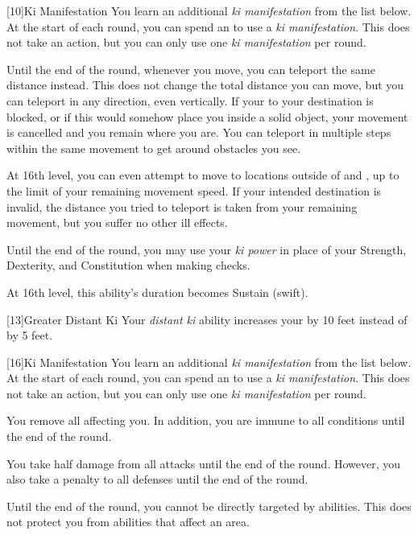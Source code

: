             [10]{Ki Manifestation}
            You learn an additional \textit{ki manifestation} from the list below.
            At the start of each round, you can spend an  to use a \textit{ki manifestation}.
            This does not take an action, but you can only use one \textit{ki manifestation} per round.
            {

                Until the end of the round, whenever you move, you can teleport the same distance instead.
                This does not change the total distance you can move, but you can teleport in any direction, even vertically.
                If your  to your destination is blocked, or if this would somehow place you inside a solid object, your movement is cancelled and you remain where you are.
                You can teleport in multiple steps within the same movement to get around obstacles you see.

                At 16th level, you can even attempt to move to locations outside of  and , up to the limit of your remaining movement speed.
                If your intended destination is invalid, the distance you tried to teleport is taken from your remaining movement, but you suffer no other ill effects.

                Until the end of the round, you may use your \textit{ki power} in place of your Strength, Dexterity, and Constitution when making checks.

                At 16th level, this ability's duration becomes Sustain (swift).
            }

            [13]{Greater Distant Ki} Your \textit{distant ki} ability increases your  by 10 feet instead of by 5 feet.

            [16]{Ki Manifestation}
            You learn an additional \textit{ki manifestation} from the list below.
            At the start of each round, you can spend an  to use a \textit{ki manifestation}.
            This does not take an action, but you can only use one \textit{ki manifestation} per round.
            {
                 You remove all  affecting you.
                In addition, you are immune to all conditions until the end of the round.

                 You take half damage from all attacks until the end of the round.
                However, you also take a  penalty to all defenses until the end of the round.

                 Until the end of the round, you cannot be directly targeted by  abilities.
                This does not protect you from abilities that affect an area.
            }

